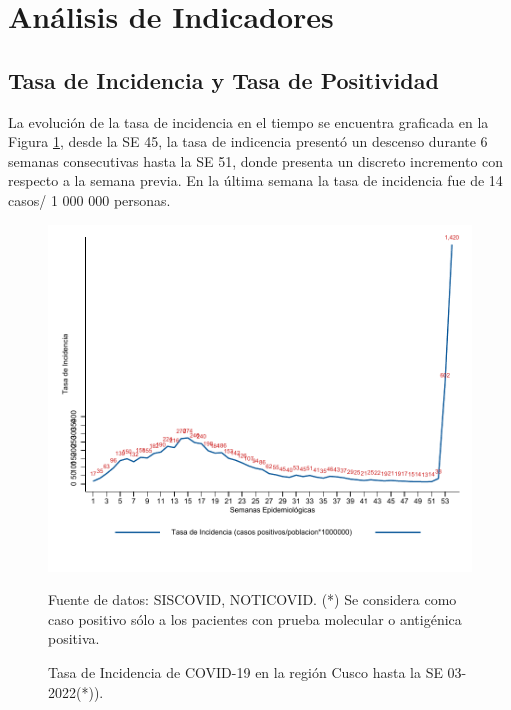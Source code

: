 \documentclass[12pt,a4paper,openany]{book}
\begin{document}

\clearpage

    \section*{Análisis de Indicadores}
   	\subsection*{Tasa de Incidencia y Tasa de Positividad}
\noindent La evolución de la tasa de incidencia en el tiempo se encuentra graficada en la Figura \ref{fig:incidencia}, desde la SE 45, la tasa de indicencia presentó un descenso durante 6 semanas consecutivas hasta la SE 51,  donde presenta un discreto incremento con respecto a la semana previa. En la última semana la tasa de incidencia fue de 14 casos/ 1 000 000 personas.  

   \begin{figure}[h]
   	\caption{Tasa de Incidencia de COVID-19 en la región Cusco hasta la SE 03-2022(*)). }\label{fig:incidencia}
   	\begin{center}
   		\includegraphics[width=0.85\linewidth]{../figuras/tasa_incidencia.pdf}
   	\end{center}
   	{\footnotesize {Fuente de datos: SISCOVID, NOTICOVID. (*) Se considera como caso positivo sólo a los pacientes con prueba molecular o antigénica positiva.}}
   \end{figure}
   
\end{document}
